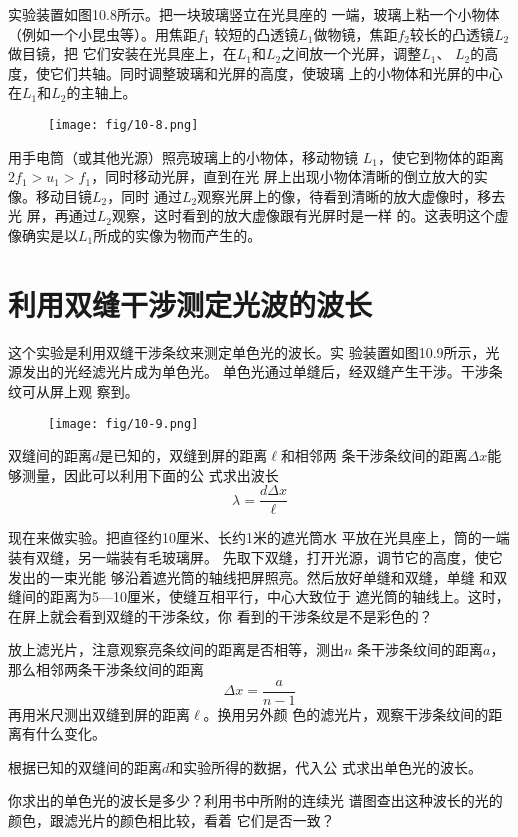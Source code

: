 实验装置如图10.8所示。把一块玻璃竖立在光具座的
一端，玻璃上粘一个小物体（例如一个小昆虫等）。用焦距$f_1$
较短的凸透镜$L_1$做物镜，焦距$f_2$较长的凸透镜$L_2$做目镜，把
它们安装在光具座上，在$L_1$和$L_2$之间放一个光屏，调整$L_1$、
$L_2$的高度，使它们共轴。同时调整玻璃和光屏的高度，使玻璃
上的小物体和光屏的中心在$L_1$和$L_2$的主轴上。
\begin{figure}[htp]\centering
    \texttt{[image: fig/10-8.png]}
    \caption{}
    \end{figure}

用手电筒（或其他光源）照亮玻璃上的小物体，移动物镜
$L_1$，使它到物体的距离$2f_1>u_1>f_1$，同时移动光屏，直到在光
屏上出现小物体清晰的倒立放大的实像。移动目镜$L_2$，同时
通过$L_2$观察光屏上的像，待看到清晰的放大虚像时，移去光
屏，再通过$L_2$观察，这时看到的放大虚像跟有光屏时是一样
的。这表明这个虚像确实是以$L_1$所成的实像为物而产生的。

\section{利用双缝干涉测定光波的波长}

这个实验是利用双缝干涉条纹来测定单色光的波长。实
验装置如图10.9所示，光源发出的光经滤光片成为单色光。
单色光通过单缝后，经双缝产生干涉。干涉条纹可从屏上观
察到。
\begin{figure}[htp]\centering
    \texttt{[image: fig/10-9.png]}
    \caption{}
    \end{figure}

双缝间的距离$d$是已知的，双缝到屏的距离$\ell$和相邻两
条干涉条纹间的距离$\Delta x$能够测量，因此可以利用下面的公
式求出波长
\[\lambda=\frac{d\Delta x}{\ell} \]

现在来做实验。把直径约10厘米、长约1米的遮光筒水
平放在光具座上，筒的一端装有双缝，另一端装有毛玻璃屏。
先取下双缝，打开光源，调节它的高度，使它发出的一束光能
够沿着遮光筒的轴线把屏照亮。然后放好单缝和双缝，单缝
和双缝间的距离为5—10厘米，使缝互相平行，中心大致位于
遮光筒的轴线上。这时，在屏上就会看到双缝的干涉条纹，你
看到的干涉条纹是不是彩色的？

放上滤光片，注意观察亮条纹间的距离是否相等，测出$n$
条干涉条纹间的距离$a$，那么相邻两条干涉条纹间的距离
\[\Delta x=\frac{a}{n-1} \]
再用米尺测出双缝到屏的距离$\ell$。换用另外颜
色的滤光片，观察干涉条纹间的距离有什么变化。

根据已知的双缝间的距离$d$和实验所得的数据，代入公
式求出单色光的波长。

你求出的单色光的波长是多少？利用书中所附的连续光
谱图查出这种波长的光的颜色，跟滤光片的颜色相比较，看着
它们是否一致？


